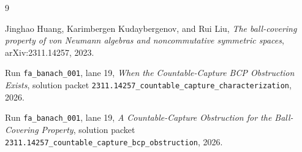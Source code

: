 \documentclass[11pt]{article}
\begin{document}
\begin{thebibliography}{9}

Jinghao Huang, Karimbergen Kudaybergenov, and Rui Liu,
\emph{The ball-covering property of von Neumann algebras and noncommutative
symmetric spaces},
arXiv:2311.14257, 2023.

Run \texttt{fa\_banach\_001}, lane 19,
\emph{When the Countable-Capture BCP Obstruction Exists},
solution packet
\texttt{2311.14257\_countable\_capture\_characterization}, 2026.

Run \texttt{fa\_banach\_001}, lane 19,
\emph{A Countable-Capture Obstruction for the Ball-Covering Property},
solution packet
\texttt{2311.14257\_countable\_capture\_bcp\_obstruction}, 2026.

\end{thebibliography}
\end{document}
